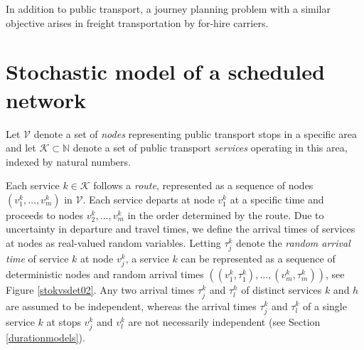 \documentclass[dissertation,draft*]{aaltoseries}
\begin{document}
In addition to public transport, a journey planning problem with a similar objective 
arises in freight transportation by for-hire carriers. 


\section{Stochastic model of a scheduled network}
Let $\mathcal{V}$ denote a set of \emph{nodes} representing public transport stops
in a specific area and let $\mathcal{K} \subset \mathbb{N}$ denote a set of public 
transport \emph{services} operating in this area, indexed by natural numbers. 

Each service $k \in \mathcal{K}$ follows a \emph{route}, represented as a sequence of nodes $(v_1^k,\ldots,v_m^k)$ in $\mathcal{V}$. 
Each service departs at node $v_1^k$ at a specific time and proceeds to nodes $v_2^k, \ldots,v_m^k$ in the order determined by the route.
Due to uncertainty in departure and travel times, we define the arrival times of services at nodes
as real-valued random variables. Letting $\tau_j^k$ denote the \emph{random arrival time} of 
service $k$ at node $v_j^k$, 
a service $k$ can be represented as a sequence of deterministic nodes and random arrival 
times $((v_1^k, \tau_1^k), \ldots, (v_m^k, \tau_m^k))$, see Figure \ref{stokvsdet02}.
Any two arrival times $\tau_j^k$ and $\tau_l^h$ of 
distinct services $k$ and $h$ are assumed to be independent,
whereas the arrival times $\tau_j^k$ and $\tau_l^k$ of a single 
service $k$ at stops $v_j^k$ and $v_l^k$ are not necessarily independent (see Section \ref{durationmodels}).
\end{document}

